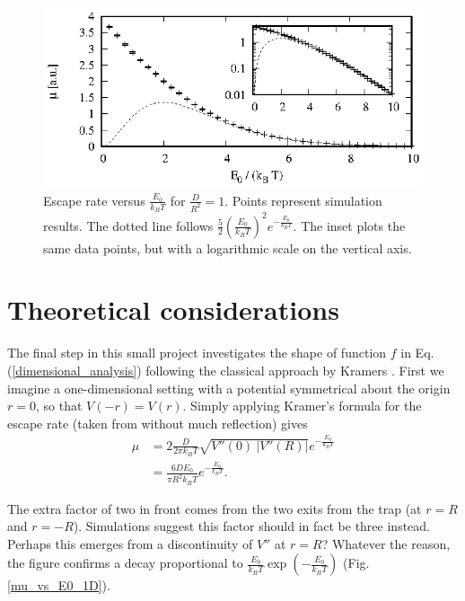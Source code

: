 \documentclass{article}
\begin{document}
\begin{figure}
  \centering
  \includegraphics[width=\linewidth]{mu_vs_E0.eps}
  \caption{\label{mu_vs_E0}Escape rate versus $\frac{E_0}{k_BT}$ for
           $\frac{D}{R^2} = 1$. Points represent simulation results. The dotted
           line follows $\frac{5}{2}\left(\frac{E_0}{k_BT}\right)^2
           e^{-\frac{E_0}{k_BT}}$. The inset plots the same data points, but
           with a logarithmic scale on the vertical axis.}
\end{figure}


\section{Theoretical considerations}

The final step in this small project investigates the shape of function $f$ in
Eq. (\ref{dimensional_analysis}) following the classical approach by Kramers
\cite{Kramers1940}. First we imagine a one-dimensional setting with a potential
symmetrical about the origin $r = 0$, so that $V(-r) = V(r)$. Simply applying
Kramer's formula for the escape rate (taken from \cite{Escape_rate} without much
reflection) gives
\begin{align}
  \mu & = 2 \frac{D}{2 \pi k_BT} \sqrt{V''(0)\ |V''(R)|}
            e^{-\frac{E_0}{k_BT}} \nonumber \\
      & = \frac{6 D E_0}{\pi R^2 k_BT} e^{-\frac{E_0}{k_BT}}.
\end{align}

The extra factor of two in front comes from the two exits from the trap (at
$r = R$ and $r = -R$). Simulations suggest this factor should in fact be three
instead. Perhaps this emerges from a discontinuity of $V''$ at $r = R$? Whatever
the reason, the figure confirms a decay proportional to
$\frac{E_0}{k_BT} \exp\left(-\frac{E_0}{k_BT}\right)$ (Fig. \ref{mu_vs_E0_1D}).
\end{document}
